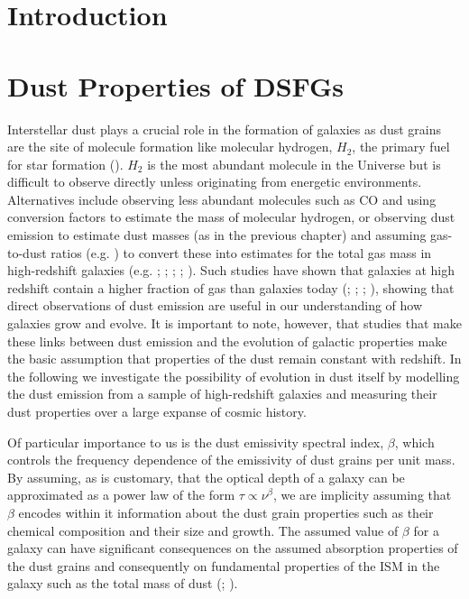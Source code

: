 \section{Introduction}

\section{Dust Properties of DSFGs}

Interstellar dust plays a crucial role in the formation of galaxies as dust grains are the site of molecule formation like molecular hydrogen, $H_2$, the primary fuel for star formation (\citealt{Kennicutt_2012}). $H_2$ is the most abundant molecule in the Universe but is difficult to observe directly unless originating from energetic environments. Alternatives include observing less abundant molecules such as CO and using conversion factors to estimate the mass of molecular hydrogen, or observing dust emission to estimate dust masses (as in the previous chapter) and assuming gas-to-dust ratios (e.g. \citealt{Saintonge_2013}) to convert these into estimates for the total gas mass in high-redshift galaxies (e.g. \citealt{Magdis_2012}; \citealt{Eales_2012}; \citealt{Scoville_2014}; \citealt{Santini_2014}; \citealt{Genzel_2015}). Such studies have shown that galaxies at high redshift contain a higher fraction of gas than galaxies today (\citealt{Tacconi_2010}; \citealt{Scoville_2016}; \citealt{Scoville_2017}; \citealt{Millard_2020}), showing that direct observations of dust emission are useful in our understanding of how galaxies grow and evolve. It is important to note, however, that studies that make these links between dust emission and the evolution of galactic properties make the basic assumption that properties of the dust remain constant with redshift. In the following we investigate the possibility of evolution in dust itself by modelling the dust emission from a sample of high-redshift galaxies and measuring their dust properties over a large expanse of cosmic history.

Of particular importance to us is the dust emissivity spectral index, $\beta$, which controls the frequency dependence of the emissivity of dust grains per unit mass. By assuming, as is customary, that the optical depth of a galaxy can be approximated as a power law of the form $\tau \propto \nu^\beta$, we are implicity assuming that $\beta$ encodes within it information about the dust grain properties such as their chemical composition and their size and growth. The assumed value of $\beta$ for a galaxy can have significant consequences on the assumed absorption properties of the dust grains and consequently on fundamental properties of the ISM in the galaxy such as the total mass of dust (\citealt{Bianchi_2013}; \citealt{Clark_2016}).

